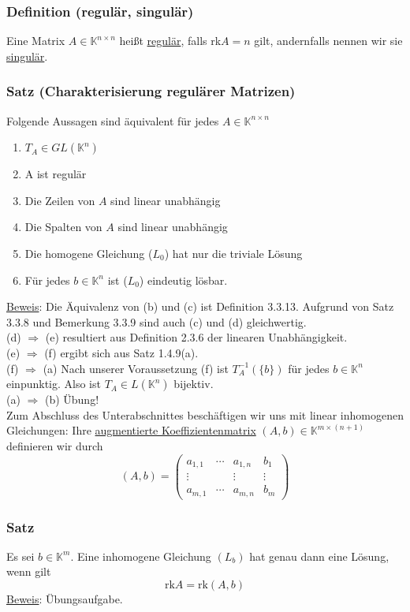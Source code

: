 \subsubsection{Definition (regulär, singulär)}
Eine Matrix $A\in\mathbb{K}^{n\times n}$ heißt \underline{regulär}, falls rk$A=n$ gilt, andernfalls nennen wir sie \underline{singulär}.
\subsubsection{Satz (Charakterisierung regulärer Matrizen)}
Folgende Aussagen sind äquivalent für jedes $A\in\mathbb{K}^{n\times n}$
\begin{enumerate}
\item $T_A\in GL(\mathbb{K}^n)$
\item A ist regulär
\item Die Zeilen von $A$ sind linear unabhängig
\item Die Spalten von $A$ sind linear unabhängig
\item Die homogene Gleichung ($L_0$) hat nur die triviale Lösung
\item Für jedes $b\in\mathbb{K}^n$ ist ($L_0$) eindeutig lösbar.
\end{enumerate}
\underline{Beweis}: Die Äquivalenz von (b) und (c) ist Definition 3.3.13.  Aufgrund von Satz 3.3.8 und Bemerkung 3.3.9 sind auch (c) und (d) gleichwertig.\\
(d) $\Rightarrow$ (e) resultiert aus Definition 2.3.6 der linearen Unabhängigkeit.\\
(e) $\Rightarrow$ (f) ergibt sich aus Satz 1.4.9(a).\\
(f) $\Rightarrow$ (a) Nach unserer Voraussetzung (f) ist $T_A^{-1}(\{b\})$ für jedes $b\in \mathbb{K}^n$ einpunktig.  Also ist $T_A\in L(\mathbb{K}^n)$ bijektiv.\\
(a) $\Rightarrow$ (b) Übung!\\
Zum Abschluss des Unterabschnittes beschäftigen wir uns mit linear inhomogenen Gleichungen: Ihre \underline{augmentierte Koeffizientenmatrix} $(A,b)\in\mathbb{K}^{m\times (n+1)}$ definieren wir durch
\[(A,b)=\begin{pmatrix}a_{1,1}& \cdots &a_{1,n} & b_1\\ \vdots & & \vdots & \vdots\\ a_{m,1}&\cdots &a_{m,n}&b_m\end{pmatrix}\]
\subsubsection{Satz}
Es sei $b\in\mathbb{K}^m$.  Eine inhomogene Gleichung $(L_b)$ hat genau dann eine Lösung, wenn gilt
\[\mathrm{rk}A=\mathrm{rk}(A,b)\]
\underline{Beweis}: Übungsaufgabe.
\addtocounter{subsubsection}{-13}
